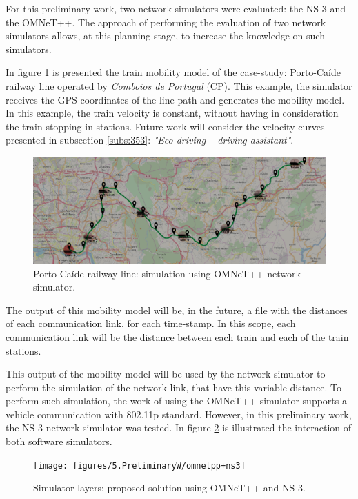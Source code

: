 For this preliminary work, two network simulators were evaluated: the NS-3 and the OMNeT++. The approach of performing the evaluation of two network simulators allows, at this planning stage, to increase the knowledge on such simulators.

In figure \ref{fig:5.porto-caide} is presented the train mobility model of the case-study: Porto-Caíde railway line operated by \textit{Comboios de Portugal} (CP). This example, the simulator receives the \ac{GPS} coordinates of the line path and generates the mobility model. In this example, the train velocity is constant, without having in consideration the train stopping in stations. Future work will consider the velocity curves presented in subsection \ref{subs:353}: \textit{"Eco-driving – driving assistant"}.


\begin{figure}[h!]
	\centering
	\includegraphics[width=\textwidth,keepaspectratio]{figures/5.PreliminaryW/porto-caide2}
	\caption{Porto-Caíde railway line: simulation using OMNeT++ network simulator.}
	\label{fig:5.porto-caide}
\end{figure}
	
	
The output of this mobility model will be, in the future, a file with the distances of each communication link, for each time-stamp. In this scope, each communication link will be the distance between each train and each of the train stations.

This output of the mobility model will be used by the network simulator to perform the simulation of the network link, that have this variable distance. To perform such simulation, the work of \cite{noori2013} using the OMNeT++ simulator supports a vehicle communication with 802.11p standard. However, in this preliminary work, the NS-3 network simulator was tested. In figure \ref{fig:5.omnetpp+ns3} is illustrated the interaction of both software simulators.

\begin{figure}[h!]
	\centering
	\texttt{[image: figures/5.PreliminaryW/omnetpp+ns3]}
	\caption{Simulator layers: proposed solution using OMNeT++ and NS-3.}
	\label{fig:5.omnetpp+ns3}
\end{figure}

